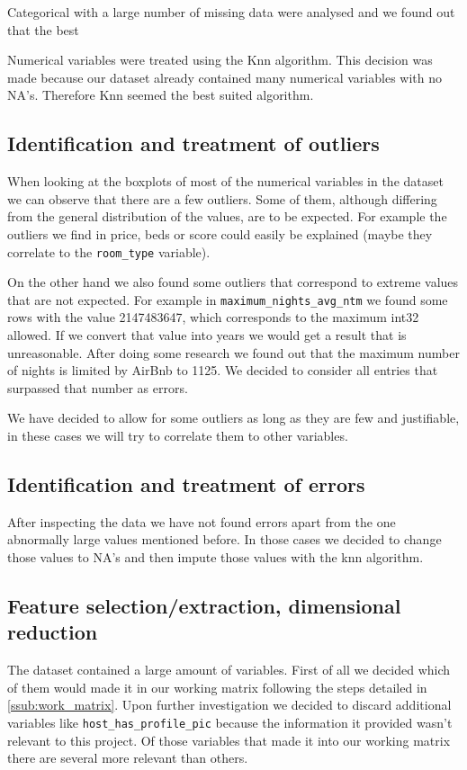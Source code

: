 Categorical with a large number of missing data were analysed and we found out that the best 

Numerical variables were treated using the Knn algorithm. This decision was made because our dataset already contained many numerical variables with no NA's. Therefore Knn seemed the best suited algorithm.

\subsection{Identification and treatment of outliers}

When looking at the boxplots of most of the numerical variables in the dataset
we can observe that there are a few outliers. Some of them, although differing
from the general distribution of the values, are to be expected. For example the
outliers we find in price, beds or score could easily be explained (maybe they
correlate to the \texttt{room\_type} variable).

On the other hand we also found some outliers that correspond to extreme values
that are not expected. For example in \texttt{maximum\_nights\_avg\_ntm} we
found some rows with the value 2147483647, which corresponds to the maximum
int32 allowed. If we convert that value into years we would get a result that is
unreasonable. After doing some research we found out that the maximum number of nights is limited by AirBnb to 1125. We decided to consider all entries that surpassed that number as errors. 

We have decided to allow for some outliers as long as they are few and
justifiable, in these cases we will try to correlate them to other variables.

\subsection{Identification and treatment of errors}

After inspecting the data we have not found errors apart from the one abnormally
large values mentioned before. In those cases we decided to change those values to NA's and then impute those values with the knn algorithm.

\subsection{Feature selection/extraction, dimensional reduction}

The \airbnb dataset contained a large amount of variables. First of all we
decided which of them would made it in our working matrix following the steps
detailed in \ref{ssub:work_matrix}. Upon further investigation we decided to
discard additional variables like \texttt{host\_has\_profile\_pic} because the
information it provided wasn't relevant to this project. Of those variables that
made it into our working matrix there are several more relevant than others.

